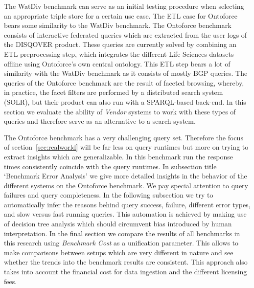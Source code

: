 

The WatDiv benchmark can serve as an initial testing procedure when selecting an appropriate triple store for a certain use case. The ETL case for Ontoforce bears some similarity to the WatDiv benchmark. 
The Ontoforce benchmark consists of interactive federated queries which are extracted from the user logs of the DISQOVER product. These queries are currently solved by combining an ETL preprocessing step, which integrates the different Life Sciences datasets offline using Ontoforce's own central ontology. This ETL step bears a lot of similarity with the WatDiv benchmark as it consists of mostly BGP queries. The queries of the Ontoforce benchmark are the result of faceted browsing, whereby, in practice, the facet filters are performed by a distributed search system (SOLR), but their product can also run with a SPARQL-based back-end. In this section we evaluate the ability of \emph{Vendor} systems to work with these types of queries and therefore serve as an alternative to a search system.

The Ontoforce benchmark has a very challenging query set. Therefore the focus of section~\ref{sec:realworld} will be far less on query runtimes but more on trying to extract insights which are generalizable. In this benchmark run the response times consistently coincide with the query runtimes.  
In subsection title `Benchmark Error Analysis' %
we give more detailed insights in the behavior of the different systems on the Ontoforce benchmark. We pay special attention to query failures and query completeness.
In the following subsection
we try to automatically infer the reasons behind query success, failure, different error types, and slow versus fast running queries. This automation is achieved by making use of decision tree analysis which should circumvent bias introduced by human interpretation.
In the final section we compare the results of all benchmarks in this research using \emph{Benchmark Cost} as a unification parameter. This allows to make comparisons between setups which are very different in nature and see whether the trends into the benchmark results are consistent. This approach also takes into account the financial cost for data ingestion and the different licensing fees.

